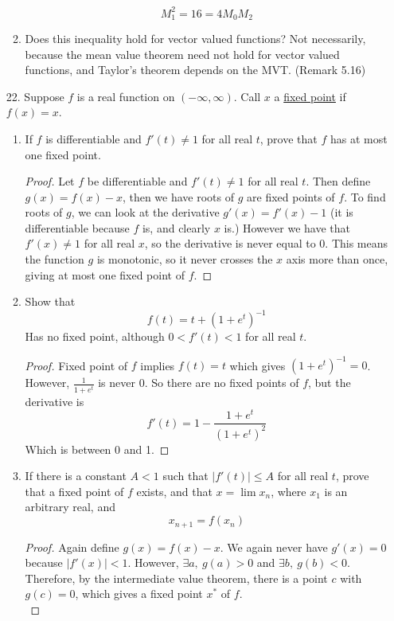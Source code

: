\documentclass[hidelinks,12pt]{article}
\renewcommand{\leq}{\leqslant}
\begin{document}
\begin{enumerate}
\begin{enumerate}[label=(\alph*).]
\[               M_{1}^{2}=16=4M_{0}M_{2}
           \]
            \item Does this inequality hold for vector valued functions? Not necessarily, because the mean value theorem need not hold for vector valued functions, and Taylor's theorem depends on the MVT. (Remark 5.16)
        \end{enumerate}   
    \item[22.] Suppose \(f\) is a real function on \((-\infty,\infty)\). Call \(x\) a \underline{fixed point} if \(f(x)=x\).
        \begin{enumerate}[label=(\alph*).]
            \item If \(f\) is differentiable and \(f'(t)\neq1\) for all real \(t\), prove that \(f\) has at most one fixed point.
                \begin{proof}
                Let \(f\) be differentiable and \(f'(t)\neq1\) for all real \(t\). Then define \(g(x)=f(x)-x\), then we have roots of \(g\) are fixed points of \(f\). To find roots of \(g\), we can look at the derivative \(g'(x)=f'(x)-1\) (it is differentiable because \(f\) is, and clearly \(x\) is.) However we have that \(f'(x)\neq1\) for all real \(x\), so the derivative is never equal to 0. This means the function \(g\) is monotonic, so it never crosses the \(x\) axis more than once, giving at most one fixed point of \(f\).
                \end{proof}
            \item Show that \[
            f(t)=t+(1+e^{t})^{-1}
            \]
           Has no fixed point, although \(0<f'(t)<1\) for all real \(t\).
           \begin{proof}
           Fixed point of \(f\) implies \(f(t)=t\) which gives \((1+e^{t})^{-1}=0\). However, \(\frac{1}{1+e^{t}}\) is never 0. So there are no fixed points of \(f\), but the derivative is 
           \[
           f'(t)=1-\frac{1+e^{t}}{(1+e^{t})^{2}}
           \]
          Which is between 0 and 1. 
           \end{proof}
       \item If there is a constant \(A<1\) such that \(|f'(t)|\leq A\) for all real \(t\), prove that a fixed point of \(f\) exists, and that \(x=\lim x_{n}\), where \(x_{1}\) is an arbitrary real, and \[
       x_{n+1}=f(x_{n})
       \]
      \begin{proof}
          Again define \(g(x)=f(x)-x\). We again never have \(g'(x)=0\) because \(|f'(x)|<1\). However, \(\exists a,\ g(a)>0\) and \(\exists b,\ g(b)<0\). Therefore, by the intermediate value theorem, there is a point \(c\) with \(g(c)=0\), which gives a fixed point \(x^{*}\) of \(f\).\\

\end{proof}
\end{enumerate}
\end{enumerate}
\end{document}
